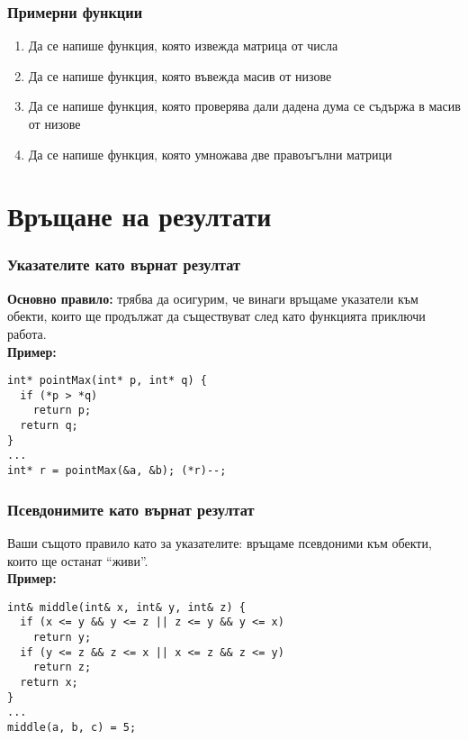 \documentclass{beamer}
\begin{document}
\begin{frame}
  \frametitle{Примерни функции}

  \begin{enumerate}[<+->]
  \item Да се напише функция, която извежда матрица от числа
  \item Да се напише функция, която въвежда масив от низове
  \item Да се напише функция, която проверява дали дадена дума се съдържа в масив от низове
  \item Да се напише функция, която умножава две правоъгълни матрици
  \end{enumerate}
\end{frame}

\section{Връщане на резултати}

\begin{frame}[fragile]
  \frametitle{Указателите като върнат резултат}

  \textbf{Основно правило:} трябва да осигурим, че винаги връщаме указатели към обекти, които ще продължат да съществуват след като функцията приключи работа.\\[2em]
  \pause
  \textbf{Пример:}
\begin{lstlisting}
int* pointMax(int* p, int* q) {
  if (*p > *q)
    return p;
  return q;
}
...
int* r = pointMax(&a, &b); (*r)--;
\end{lstlisting}
\end{frame}

\begin{frame}[fragile]
  \frametitle{Псевдонимите като върнат резултат}

  Ваши същото правило като за указателите: връщаме псевдоними към обекти, които ще останат ``живи''.\\[2em]
  \pause
  \textbf{Пример:}
\begin{lstlisting}
int& middle(int& x, int& y, int& z) {
  if (x <= y && y <= z || z <= y && y <= x)
    return y;
  if (y <= z && z <= x || x <= z && z <= y)
    return z;
  return x;
}
...
middle(a, b, c) = 5;
\end{lstlisting}
\end{frame}
\end{document}

